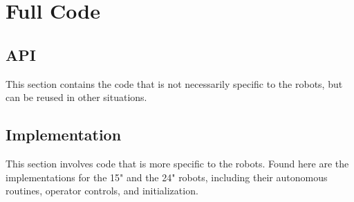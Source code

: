 \chapter{Full Code}
\section{API}
This section contains the code that is not necessarily specific to the robots,
but can be reused in other situations.

\section{Implementation}
This section involves code that is more specific to the robots. Found here are
the implementations for the 15" and the 24" robots, including their autonomous
routines, operator controls, and initialization.

